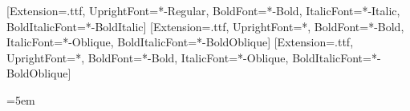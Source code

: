 \usepackage{fontspec}
\setmainfont{Tinos}[Extension=.ttf, UprightFont=*-Regular, BoldFont=*-Bold, ItalicFont=*-Italic, BoldItalicFont=*-BoldItalic]
\setsansfont{DejaVuSans}[Extension=.ttf, UprightFont=*, BoldFont=*-Bold, ItalicFont=*-Oblique, BoldItalicFont=*-BoldOblique]
\setmonofont{DejaVuSansMono}[Extension=.ttf, UprightFont=*, BoldFont=*-Bold, ItalicFont=*-Oblique, BoldItalicFont=*-BoldOblique]

\usepackage[english,russian]{babel}


\usepackage[a4paper,left=25mm,right=15mm,top=20mm,bottom=20mm]{geometry}
\usepackage{setspace}
\onehalfspacing
\usepackage{indentfirst}
\setlength{\parindent}{1.25cm}
\setlength{\parskip}{6pt}

\usepackage{microtype}
\usepackage{csquotes}
\usepackage{amsmath}
\usepackage{amssymb}
\usepackage{graphicx}
\usepackage{xcolor}
\usepackage{float}
\usepackage{array}
\usepackage{booktabs}
\usepackage{longtable}
\usepackage{tabularx}
\usepackage{adjustbox}
\usepackage{xurl}
\usepackage{hyphenat}
\usepackage{caption}
\captionsetup[table]{position=top,labelsep=emdash,justification=raggedright,singlelinecheck=false}

\addto\captionsrussian{\renewcommand{\tablename}{Таблица}}


\usepackage{enumitem}
\usepackage{fancyhdr}
\pagestyle{plain}
\usepackage{titlesec}
\titleformat{\section}{\bfseries\large}{\thesection}{0.6em}{}
\titleformat{\subsection}{\bfseries}{\thesubsection}{0.6em}{}

\emergencystretch=5em

\usepackage{hyperref}
\hypersetup{unicode=true,breaklinks=true,colorlinks=true,linkcolor=black,urlcolor=blue,citecolor=blue}



